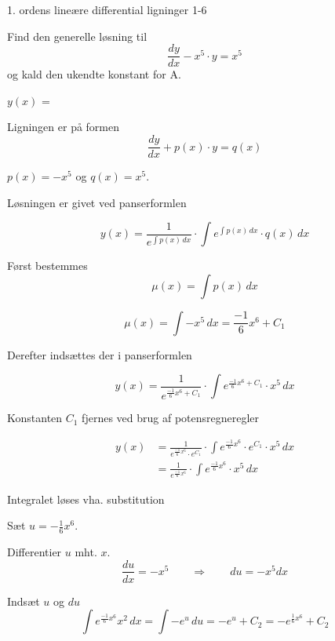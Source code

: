 \documentclass{article}
\begin{document}
\begin{exercise}{1. ordens lineære differential ligninger 1-6}
	
	
	Find den generelle løsning til
	\[
	\frac{dy}{dx} - x^5 \cdot y = x^5
	\]
	og kald den ukendte konstant for A.
	
	$y(x)$ =   \\
	
	
	
	\hint
	
	Ligningen er på formen
	\[
	\frac{dy}{dx} + p(x) \cdot y = q(x)
	\]
	
	\hint
	
	$p(x)=-x^5$ og $q(x)=x^5$.
	
	\hint
	
	Løsningen er givet ved panserformlen
	
	
	\hint
	
	\[
	y(x) = \frac{1}{e^{\int p(x) \, dx}} \cdot \int e^{\int p(x) \, dx}  \cdot q(x) \, dx
	\]
	
	\hint
	
	Først bestemmes 
	\[
	\mu(x) = \int p(x) \, dx
	\]
	
	\hint
	\[
	\mu(x) = \int -x^5 \, dx = \frac{-1}{6} x^6 + C_1
	\]
	
	\hint
	Derefter indsættes der i  panserformlen
	
	\hint
	
	\[
	y(x) = \frac{1}{e^{\frac{-1}{6}x^6 + C_1}} \cdot \int e^{\frac{-1}{6}x^6 + C_1}  \cdot x^5 \, dx
	\]
	
	
	\hint
	
	Konstanten $C_1$ fjernes ved brug af potensregneregler
	
	\hint
	\begin{align*}
	y(x) &= \frac{1}{e^{\frac{-1}{6}x^6} \cdot e^{C_1}} \cdot \int e^{\frac{-1}{6}x^6} \cdot e^{C_1}  \cdot x^5 \, dx  \\
	&= \frac{1}{e^{\frac{-1}{6}x^6}} \cdot \int e^{\frac{-1}{6}x^6}  \cdot x^5 \, dx
	\end{align*}
	
	\hint
	
	Integralet løses vha. substitution
	
	
	\hint
	Sæt $u = -\frac{1}{6}x^6$.
	
	\hint
	
	Differentier $u$ mht. $x$.
	\[
	\frac{du}{dx} = -x^5 \qquad	\Rightarrow \qquad du = -x^5 dx
	\]
	
	\hint 
	Indsæt $u$ og $du$
	\[
	\int e^{\frac{-1}{6}x^6}x^2 \, dx = \int -e^{u} \, du = -e^{u} + C_2 = -e^{\frac{1}{6}x^6} + C_2
	\]
	

\end{exercise}
\end{document}
